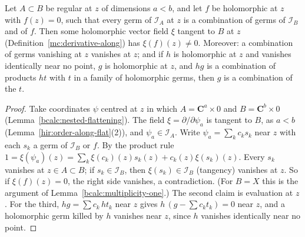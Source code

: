 \begin{lemma}
\label{bcalc:tangent-generator-along}
\leanok
Let \(A\subset B\) be regular at \(z\) of dimensions \(a<b\), and let \(f\) be holomorphic at \(z\) with \(f(z)=0\), such that every germ of
\(\mathcal I_A\) at \(z\) is a combination of germs of \(\mathcal I_B\) and of \(f\). Then some holomorphic vector field \(\xi\) tangent to \(B\) at \(z\)
(Definition~\ref{mc:derivative-along}) has \(\xi(f)(z)\ne0\). Moreover: a combination of germs vanishing at \(z\) vanishes at \(z\); and if \(h\) is
holomorphic at \(z\) and vanishes identically near no point, \(g\) is holomorphic at \(z\), and \(hg\) is a combination of products \(ht\) with \(t\) in
a family of holomorphic germs, then \(g\) is a combination of the \(t\).
\end{lemma}
\begin{proof}
\leanok
Take coordinates \(\psi\) centred at \(z\) in which \(A=\mathbf C^a\times0\) and \(B=\mathbf C^b\times0\) (Lemma~\ref{bcalc:nested-flattening}). The field
\(\xi=\partial/\partial\psi_a\) is tangent to \(B\), as \(a<b\) (Lemma~\ref{hir:order-along-flat}(2)), and \(\psi_a\in\mathcal I_A\). Write
\(\psi_a=\sum_kc_ks_k\) near \(z\) with each \(s_k\) a germ of \(\mathcal I_B\) or \(f\). By the product rule
\(1=\xi(\psi_a)(z)=\sum_k\xi(c_k)(z)s_k(z)+c_k(z)\xi(s_k)(z)\). Every \(s_k\) vanishes at \(z\in A\subset B\); if \(s_k\in\mathcal I_B\), then \(\xi(s_k)\in\mathcal I_B\)
(tangency) vanishes at \(z\). So if \(\xi(f)(z)=0\), the right side vanishes, a contradiction. (For \(B=X\) this is the argument of
Lemma~\ref{bcalc:multiplicity-one}.) The second claim is evaluation at \(z\). For the third, \(hg=\sum c_k\,ht_k\) near \(z\) gives
\(h\,(g-\sum c_kt_k)=0\) near \(z\), and a holomorphic germ killed by \(h\) vanishes near \(z\), since \(h\) vanishes identically near no point.
\end{proof}

